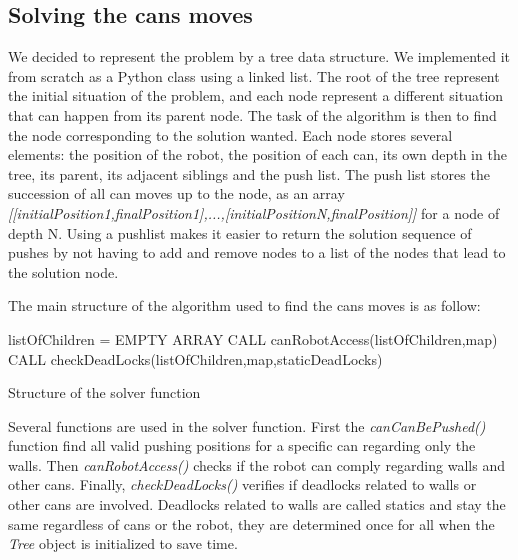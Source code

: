 \documentclass[a4paper,12pt]{article}
\begin{document}
\subsection{Solving the cans moves}
We decided to represent the problem by a tree data structure. We implemented it from scratch as a Python class using a linked list. The root of the tree represent the initial situation of the problem, and each node represent a different situation that can happen from its parent node. The task of the algorithm is then to find the node corresponding to the solution wanted.
Each node stores several elements: the position of the robot, the position of each can, its own depth in the tree, its parent, its adjacent siblings and the push list. The push list stores the succession of all can moves up to the node, as an array \textit{[[initialPosition1,finalPosition1],...,[initialPositionN,finalPosition]]} for a node of depth N. Using a pushlist makes it easier to return the solution sequence of pushes by not having to add and remove nodes to a list of the nodes that lead to the solution node.

The main structure of the algorithm used to find the cans moves is as follow:

\begin{algorithm}[H]
listOfChildren = EMPTY ARRAY\; \newline
{}
CALL canRobotAccess(listOfChildren,map)\;\newline
CALL checkDeadLocks(listOfChildren,map,staticDeadLocks)\; \newline
\caption{Structure of the solver function}
\end{algorithm}

Several functions are used in the solver function. First the \textit{canCanBePushed()} function find all valid pushing positions for a specific can regarding only the walls. Then \textit{canRobotAccess()} checks if the robot can comply regarding walls and other cans. Finally, \textit{checkDeadLocks()} verifies if deadlocks related to walls or other cans are involved. Deadlocks related to walls are called statics and stay the same regardless of cans or the robot, they are determined once for all when the \textit{Tree} object is initialized to save time.
\end{document}
